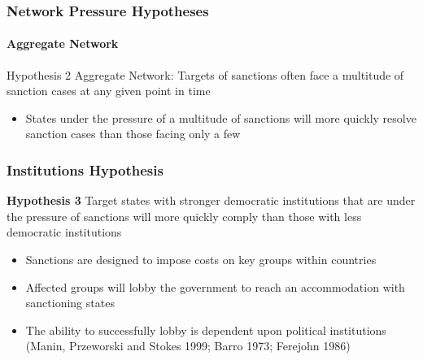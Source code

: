 \begin{frame}
\frametitle{Network Pressure Hypotheses}
\framesubtitle{Aggregate Network}

\begin{block}{Hypothesis 2}
	Aggregate Network: Targets of sanctions often face a multitude of sanction cases at any given point in time
\end{block}

\begin{itemize}
	\item States under the pressure of a multitude of sanctions will more quickly resolve sanction cases than those facing only a few
\end{itemize}

\end{frame}

\begin{frame}
\frametitle{Institutions Hypothesis}

\begin{block}{\textbf{Hypothesis 3}}
	Target states with stronger democratic institutions that are under the pressure of sanctions will more quickly comply than those with less democratic institutions
\end{block}

\begin{itemize}
	\item Sanctions are designed to impose costs on key groups within countries
	\item Affected groups will lobby the government to reach an accommodation with sanctioning states
	\item The ability to successfully lobby is dependent upon political institutions (Manin, Przeworski and Stokes 1999; Barro 1973; Ferejohn 1986)
\end{itemize}

\end{frame}

